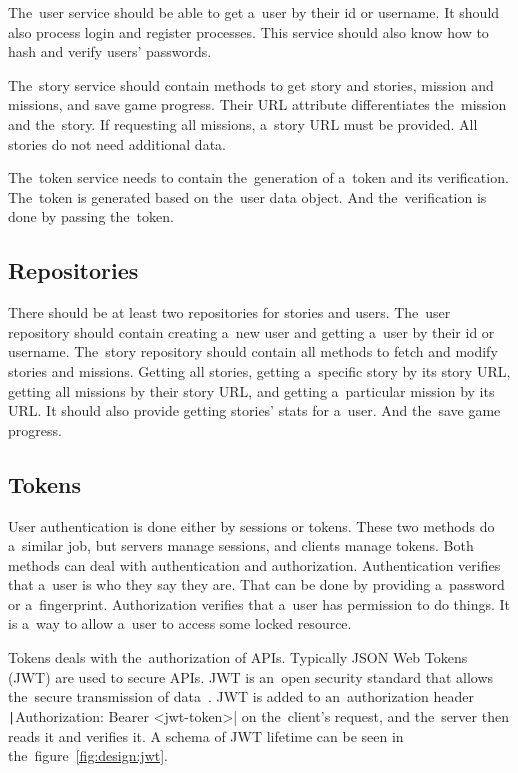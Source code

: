 The~user service should be able to get a~user by their id or username.
It should also process login and register processes.
This service should also know how to hash and verify users' passwords.

The~story service should contain methods to get story and stories, mission and missions, and save game progress.
Their URL attribute differentiates the~mission and the~story.
If requesting all missions, a~story URL must be provided.
All stories do not need additional data.

The~token service needs to contain the~generation of a~token and its verification.
The~token is generated based on the~user data object.
And the~verification is done by passing the~token.

\subsection{Repositories}

There should be at least two repositories for stories and users.
The~user repository should contain creating a~new user and getting a~user by their id or username.
The~story repository should contain all methods to fetch and modify stories and missions.
Getting all stories, getting a~specific story by its story URL, getting all missions by their story URL, and getting a~particular mission by its URL.
It should also provide getting stories' stats for a~user.
And the~save game progress.

\subsection{Tokens}
\label{design:server:tokens}

User authentication is done either by sessions or tokens.
These two methods do a~similar job, but servers manage sessions, and clients manage tokens.
Both methods can deal with authentication and authorization.
Authentication verifies that a~user is who they say they are.
That can be done by providing a~password or a~fingerprint.
Authorization verifies that a~user has permission to do things.
It is a~way to allow a~user to access some locked resource.~\cite{lin_2018_tuck}

Tokens deals with the~authorization of APIs.
Typically JSON Web Tokens (JWT) are used to secure APIs.
JWT is an~open security standard that allows the~secure transmission of data~\cite{lin_2018_tuck}.
JWT is added to an~authorization header \texttt|Authorization: Bearer <jwt-token>| on the~client's request, and the~server then reads it and verifies it.
A schema of JWT lifetime can be seen in the~figure~\ref{fig:design:jwt}.

